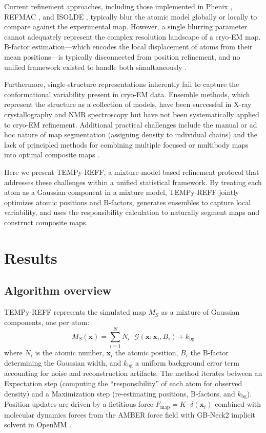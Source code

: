 \documentclass[11pt,a4paper]{article}
\begin{document}
Current refinement approaches, including those implemented in Phenix \citep{Afonine2018}, REFMAC \citep{Murshudov2011}, and ISOLDE \citep{Croll2018}, typically blur the atomic model globally or locally to compare against the experimental map. However, a single blurring parameter cannot adequately represent the complex resolution landscape of a cryo-EM map. B-factor estimation---which encodes the local displacement of atoms from their mean positions---is typically disconnected from position refinement, and no unified framework existed to handle both simultaneously \citep{Rosenthal2003, Fernandez2008}.

Furthermore, single-structure representations inherently fail to capture the conformational variability present in cryo-EM data. Ensemble methods, which represent the structure as a collection of models, have been successful in X-ray crystallography \citep{Burnley2012, Levin2007} and NMR spectroscopy \citep{Bonvin2005} but have not been systematically applied to cryo-EM refinement. Additional practical challenges include the manual or ad hoc nature of map segmentation (assigning density to individual chains) and the lack of principled methods for combining multiple focused or multibody maps into optimal composite maps \citep{Nakane2018, Ilca2015}.

Here we present TEMPy-REFF, a mixture-model-based refinement protocol that addresses these challenges within a unified statistical framework. By treating each atom as a Gaussian component in a mixture model, TEMPy-REFF jointly optimizes atomic positions and B-factors, generates ensembles to capture local variability, and uses the responsibility calculation to naturally segment maps and construct composite maps.

\section{Results}

\subsection{Algorithm overview}

TEMPy-REFF represents the simulated map $M_S$ as a mixture of Gaussian components, one per atom:
\begin{equation}
M_S(\mathbf{x}) = \sum_{i=1}^{N} N_i \cdot \mathcal{G}(\mathbf{x}; \mathbf{x}_i, B_i) + k_{\text{bg}}
\end{equation}
where $N_i$ is the atomic number, $\mathbf{x}_i$ the atomic position, $B_i$ the B-factor determining the Gaussian width, and $k_{\text{bg}}$ a uniform background error term accounting for noise and reconstruction artifacts. The method iterates between an Expectation step (computing the ``responsibility'' of each atom for observed density) and a Maximization step (re-estimating positions, B-factors, and $k_{\text{bg}}$). Position updates are driven by a fictitious force $F_{\text{map}} = K \cdot \delta(\mathbf{x}_i)$ combined with molecular dynamics forces from the AMBER force field with GB-Neck2 implicit solvent in OpenMM \citep{Case2014, Eastman2017}.
\end{document}
